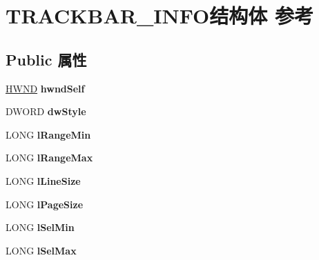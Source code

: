 \hypertarget{struct_t_r_a_c_k_b_a_r___i_n_f_o}{}\section{T\+R\+A\+C\+K\+B\+A\+R\+\_\+\+I\+N\+F\+O结构体 参考}
\label{struct_t_r_a_c_k_b_a_r___i_n_f_o}
\subsection*{Public 属性}
\begin{DoxyCompactItemize}
\item 
\mbox{\label{struct_t_r_a_c_k_b_a_r___i_n_f_o_a6abc843604fdc69469d604b8550bdf05}} 
\hyperlink{interfacevoid}{H\+W\+ND} {\bfseries hwnd\+Self}
\item 
\mbox{\label{struct_t_r_a_c_k_b_a_r___i_n_f_o_a284ff366481e86ccf76f3e5a0edd83da}} 
D\+W\+O\+RD {\bfseries dw\+Style}
\item 
\mbox{\label{struct_t_r_a_c_k_b_a_r___i_n_f_o_a3f91929234041fa7f928c05c916c1a42}} 
L\+O\+NG {\bfseries l\+Range\+Min}
\item 
\mbox{\label{struct_t_r_a_c_k_b_a_r___i_n_f_o_a1d3efe2910d4f1ef6d96ae30a34c861a}} 
L\+O\+NG {\bfseries l\+Range\+Max}
\item 
\mbox{\label{struct_t_r_a_c_k_b_a_r___i_n_f_o_a0739651a362b607d0cb593e31ecf94c7}} 
L\+O\+NG {\bfseries l\+Line\+Size}
\item 
\mbox{\label{struct_t_r_a_c_k_b_a_r___i_n_f_o_a07d24a8b9f7f01d914f1ec6fde7bc4ac}} 
L\+O\+NG {\bfseries l\+Page\+Size}
\item 
\mbox{\label{struct_t_r_a_c_k_b_a_r___i_n_f_o_a0d2a1e5c1811df33c4e0e0531f03c2a2}} 
L\+O\+NG {\bfseries l\+Sel\+Min}
\item 
\mbox{\label{struct_t_r_a_c_k_b_a_r___i_n_f_o_a1d57ab809b588ca14d83deb3b85c2f92}} 
L\+O\+NG {\bfseries l\+Sel\+Max}

\end{DoxyCompactItemize}
